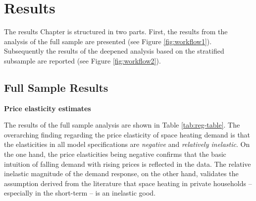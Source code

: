 \documentclass[12pt,twoside]{reedthesis}
\begin{document}
\hypertarget{results}{%
\chapter{Results}\label{results}}

The results Chapter is structured in two parts. First, the results from the analysis of the full sample are presented (see Figure \ref{fig:workflow1}). Subsequently the results of the deepened analysis based on the stratified subsample are reported (see Figure \ref{fig:workflow2}).

\hypertarget{full-sample-results}{%
\section{Full Sample Results}\label{full-sample-results}}

\textbf{Price elasticity estimates}

The results of the full sample analysis are shown in Table \ref{tab:reg-table}. The overarching finding regarding the price elasticity of space heating demand is that the elasticities in all model specifications are \emph{negative} and \emph{relatively inelastic}. On the one hand, the price elasticities being negative confirms that the basic intuition of falling demand with rising prices is reflected in the data. The relative inelastic magnitude of the demand response, on the other hand, validates the assumption derived from the literature that space heating in private households -- especially in the short-term -- is an inelastic good.
\end{document}
